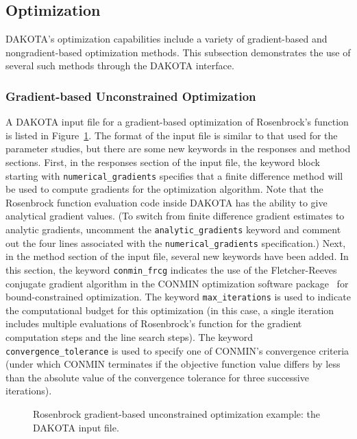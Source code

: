 \subsection{Optimization}\label{tutorial:example:optimization}

DAKOTA's optimization capabilities include a variety of gradient-based 
and nongradient-based optimization methods. This subsection demonstrates
the use of several such methods through the DAKOTA interface.

\subsubsection{Gradient-based Unconstrained Optimization}\label{tutorial:example:optimization:gradient1}

A DAKOTA input file for a gradient-based optimization of Rosenbrock's
function is listed in Figure~\ref{tutorial:rosenbrock_grad}. The
format of the input file is similar to that used for the parameter
studies, but there are some new keywords in the responses and method
sections.  First, in the responses section of the input file, the
keyword block starting with \texttt{numerical\_gradients} specifies
that a finite difference method will be used to compute gradients for
the optimization algorithm. Note that the Rosenbrock function
evaluation code inside DAKOTA has the ability to give analytical
gradient values.  (To switch from finite difference gradient estimates
to analytic gradients, uncomment the \texttt{analytic\_gradients}
keyword and comment out the four lines associated with the
\texttt{numerical\_gradients} specification.)
Next, in the method
section of the input file, several new keywords have been added. In
this section, the keyword \texttt{conmin\_frcg} indicates the use of
the Fletcher-Reeves conjugate gradient algorithm in the CONMIN
optimization software package~\cite{Van78} for bound-constrained
optimization.  The keyword \texttt{max\_iterations} is used to
indicate the computational budget for this optimization (in this case,
a single iteration includes multiple evaluations of Rosenbrock's
function for the gradient computation steps and the line search
steps). The keyword \texttt{convergence\_tolerance} is used to specify
one of CONMIN's convergence criteria (under which CONMIN terminates if the
objective function value differs by less than the absolute value of
the convergence tolerance for three successive iterations).

\begin{figure}
  \centering
  \begin{bigbox}
    \begin{small}
    \end{small}
  \end{bigbox}
  \caption{Rosenbrock gradient-based unconstrained optimization
  example: the DAKOTA input file.}
  \label{tutorial:rosenbrock_grad}
\end{figure}

